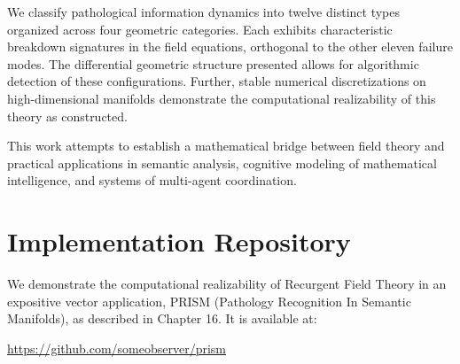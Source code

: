 \documentclass[11pt, a4paper]{report}
\begin{document}
We classify pathological information dynamics into twelve distinct types organized across four geometric categories. Each exhibits characteristic breakdown signatures in the field equations, orthogonal to the other eleven failure modes. The differential geometric structure presented allows for algorithmic detection of these configurations. Further, stable numerical discretizations on high-dimensional manifolds demonstrate the computational realizability of this theory as constructed.

\vspace{1em}

This work attempts to establish a mathematical bridge between field theory and practical applications in semantic analysis, cognitive modeling of mathematical intelligence, and systems of multi-agent coordination.

\tableofcontents


















\appendix
\chapter{Implementation Repository}
\label{appendix:implementation}

We demonstrate the computational realizability of Recurgent Field Theory in an expositive vector application, PRISM (Pathology Recognition In Semantic Manifolds), as described in Chapter 16. It is available at:

\begin{center}
\url{https://github.com/someobserver/prism}
\end{center}
\end{document}
